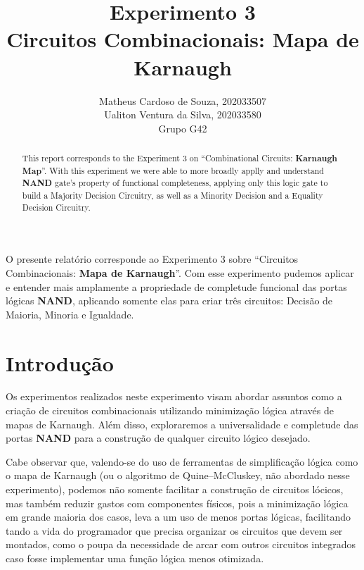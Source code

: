 \documentclass[12pt]{article}
\title{Experimento 3\\
Circuitos Combinacionais: Mapa de Karnaugh}
\author{Matheus Cardoso de Souza, 202033507\\
        Ualiton Ventura da Silva, 202033580\\
        Grupo G42
}
\begin{document}
\maketitle

 \begin{abstract}
   This report corresponds to the Experiment 3 on ``Combinational Circuits: \textbf{Karnaugh Map}''. With this experiment we were able to more broadly applly and understand \textbf{NAND} gate's property of functional completeness, applying only this logic gate to build a Majority Decision Circuitry, as well as a Minority Decision and a Equality Decision Circuitry.
 \end{abstract}

 \begin{resumo}
  O presente relatório corresponde ao Experimento 3 sobre ``Circuitos Combinacionais: \textbf{Mapa de Karnaugh}''. Com esse experimento pudemos aplicar e entender mais amplamente a propriedade de completude funcional das portas lógicas \textbf{NAND}, aplicando somente elas para criar três circuitos: Decisão de Maioria, Minoria e Igualdade.
 \end{resumo}


\section{Introdução}
\label{sec:Introducao}


Os experimentos realizados neste experimento visam abordar assuntos como a
criação de circuitos combinacionais utilizando minimização lógica através de
mapas de Karnaugh. Além disso, exploraremos a universalidade e completude das
portas \textbf{NAND} para a construção de qualquer circuito lógico desejado.

Cabe observar que, valendo-se do uso de ferramentas de simplificação lógica como
o mapa de Karnaugh (ou o algoritmo de Quine–McCluskey, não abordado nesse
experimento), podemos não somente facilitar a construção de circuitos lócicos,
mas também reduzir gastos com componentes físicos, pois a minimização lógica em
grande maioria dos casos, leva a um uso de menos portas lógicas, facilitando
tando a vida do programador que precisa organizar os circuitos que devem ser
montados, como o poupa da necessidade de arcar com outros circuitos integrados
caso fosse implementar uma função lógica menos otimizada.
\end{document}
